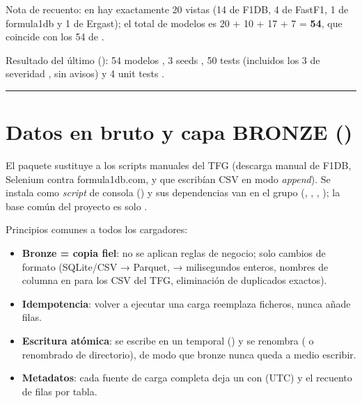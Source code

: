 \begin{nota}
Nota de recuento: en  hay exactamente 20 vistas  (14 de F1DB, 4 de FastF1, 1 de formula1db y 1 de Ergast); el total de modelos es 20 + 10 + 17 + 7 = \textbf{54}, que coincide con los 54  de .
\end{nota}

Resultado del último  (): 54 modelos , 3 seeds , 50 tests  (incluidos los 3 de severidad , sin avisos) y 4 unit tests .

\medskip\noindent\textcolor{muted!40}{\rule{\linewidth}{0.3pt}}\medskip

\section{Datos en bruto y capa BRONZE ()}

El paquete  sustituye a los scripts manuales del TFG (descarga manual de F1DB, Selenium contra formula1db.com,  y  que escribían CSV en modo \emph{append}). Se instala como \emph{script} de consola  () y sus dependencias van en el grupo  (, , , ); la base común del proyecto es solo .

Principios comunes a todos los cargadores:

\begin{itemize}
\item \textbf{Bronze = copia fiel}: no se aplican reglas de negocio; solo cambios de formato (SQLite/CSV → Parquet,  → milisegundos enteros, nombres de columna en  para los CSV del TFG, eliminación de duplicados exactos).
\item \textbf{Idempotencia}: volver a ejecutar una carga reemplaza ficheros, nunca añade filas.
\item \textbf{Escritura atómica}: se escribe en un temporal () y se renombra ( o renombrado de directorio), de modo que bronze nunca queda a medio escribir.
\item \textbf{Metadatos}: cada fuente de carga completa deja un  con  (UTC) y el recuento de filas por tabla.
\end{itemize}

